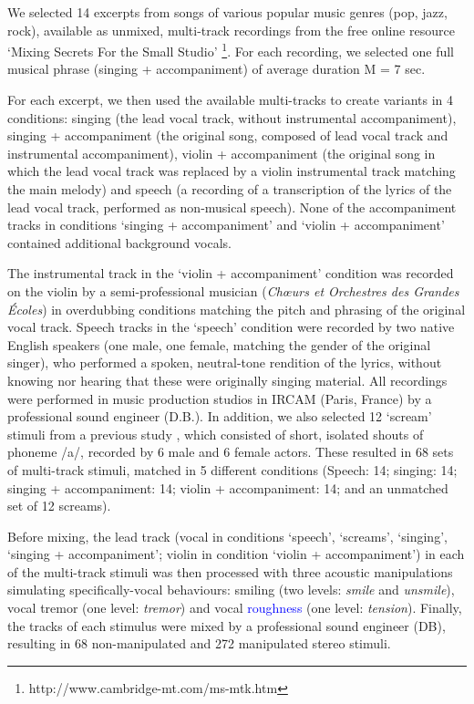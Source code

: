 \documentclass[openacc]{rsprocb_new}%
\begin{document}
We selected 14 excerpts from songs of various popular music genres (pop, jazz, rock), available as unmixed, multi-track recordings from the free online resource `Mixing Secrets For the Small Studio' \footnote{http://www.cambridge-mt.com/ms-mtk.htm}. For each recording, we selected one full musical phrase (singing + accompaniment) of average duration M = 7 sec.

For each excerpt, we then used the available multi-tracks to create variants in 4 conditions: singing (the lead vocal track, without instrumental accompaniment), singing + accompaniment (the original song, composed of lead vocal track and instrumental accompaniment), violin + accompaniment (the original song in which the lead vocal track was replaced by a violin instrumental track matching the main melody) and speech (a recording of a transcription of the lyrics of the lead vocal track, performed as non-musical speech). None of the accompaniment tracks in conditions `singing + accompaniment' and `violin + accompaniment' contained additional background vocals. 

The instrumental track in the `violin + accompaniment' condition was recorded on the violin by a semi-professional musician (\emph {Ch\oe urs et Orchestres des Grandes Écoles}) in overdubbing conditions matching the pitch and phrasing of the original vocal track. Speech tracks in the `speech' condition were recorded by two native English speakers (one male, one female, matching the gender of the original singer), who performed a spoken, neutral-tone rendition of the lyrics, without knowing nor hearing that these were originally singing material. All recordings were performed in music production studios in IRCAM (Paris, France) by a professional sound engineer (D.B.). In addition, we also selected 12 `scream' stimuli from a previous study \cite{LIU20}, which consisted of short, isolated shouts of phoneme /a/, recorded by 6 male and 6 female actors. These resulted in 68 sets of multi-track stimuli, matched in 5 different conditions (Speech: 14; singing: 14; singing + accompaniment: 14; violin + accompaniment: 14; and an unmatched set of 12 screams). 

Before mixing, the lead track (vocal in conditions `speech', `screams', `singing', `singing + accompaniment'; violin in condition `violin + accompaniment') in each of the multi-track stimuli was then processed with three acoustic manipulations simulating specifically-vocal behaviours: smiling (two levels: \emph{smile} and \emph{unsmile}), vocal tremor (one level: \emph{tremor}) and vocal \textcolor{blue}{roughness} (one level: \emph{tension}). Finally, the tracks of each stimulus were mixed by a professional sound engineer (DB), resulting in 68 non-manipulated and 272 manipulated stereo stimuli. 
\end{document}
